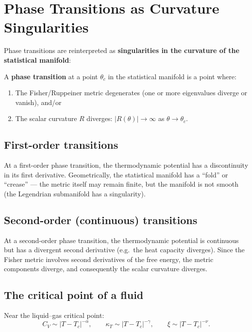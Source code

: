 \section{Phase Transitions as Curvature Singularities}

Phase transitions are reinterpreted as \textbf{singularities in the curvature of the statistical manifold}:

\begin{definition}
A \textbf{phase transition} at a point $\theta_c$ in the statistical manifold is a point where:
\begin{enumerate}
\item The Fisher/Ruppeiner metric degenerates (one or more eigenvalues diverge or vanish), and/or
\item The scalar curvature $R$ diverges: $|R(\theta)| \to \infty$ as $\theta \to \theta_c$.
\end{enumerate}
\end{definition}

\subsection{First-order transitions}

At a first-order phase transition, the thermodynamic potential has a discontinuity in its first derivative. Geometrically, the statistical manifold has a ``fold'' or ``crease'' --- the metric itself may remain finite, but the manifold is not smooth (the Legendrian submanifold has a singularity).

\subsection{Second-order (continuous) transitions}

At a second-order phase transition, the thermodynamic potential is continuous but has a divergent second derivative (e.g.\ the heat capacity diverges). Since the Fisher metric involves second derivatives of the free energy, the metric components diverge, and consequently the scalar curvature diverges.

\subsection{The critical point of a fluid}

Near the liquid--gas critical point:
\begin{equation}
C_V \sim |T - T_c|^{-\alpha}, \qquad \kappa_T \sim |T - T_c|^{-\gamma}, \qquad \xi \sim |T - T_c|^{-\nu}.
\end{equation}


